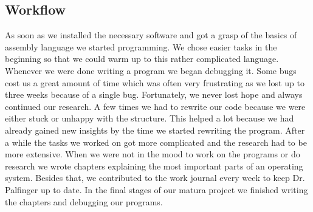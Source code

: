 \subsection{Workflow}

As soon as we installed the necessary software and got a grasp of the basics of assembly language we started programming. We chose easier tasks in the beginning so that
we could warm up to this rather complicated language. Whenever we were done writing a program we began debugging it. Some bugs cost us a great amount of time which 
was often very frustrating as we lost up to three weeks because of a single bug. Fortunately, we never lost hope and always continued our research. A few times we 
had to rewrite our code because we were either stuck or unhappy with the structure. This helped a lot because we had already gained new insights by the time we started rewriting 
the program. After a while the tasks we worked on got more complicated and the research had to be more extensive. When we were not in the mood to work on the programs or do 
research we wrote chapters explaining the most important parts of an operating system. Besides that, we contributed to the work journal every week to keep Dr. Palfinger up 
to date. In the final stages of our matura project we finished writing the chapters and debugging our programs. 

